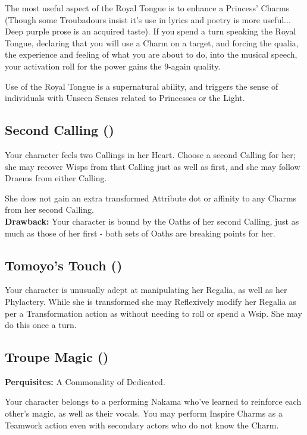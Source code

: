 The most useful aspect of the Royal Tongue is to enhance a Princess' Charms (Though some Troubadours insist it's use in lyrics and poetry is more useful... Deep purple prose is an acquired taste). If you spend a turn speaking the Royal Tongue, declaring that you will use a Charm on a target, and forcing the qualia, the experience and feeling of what you are about to do, into the musical speech, your activation roll for the power gains the 9-again quality. 

Use of the Royal Tongue is a supernatural ability, and triggers the sense of individuals with Unseen Senses related to Princesses or the Light.

\subsection*{Second Calling (\textbullet\textbullet)}
Your character feels two Callings in her Heart. Choose a second Calling for her; she may recover Wisps from that Calling just as well as first, and she may follow Draems from either Calling. 

She does not gain an extra transformed Attribute dot or affinity to any Charms from her second Calling.\\

\noindent \textbf{Drawback:} Your character is bound by the Oaths of her second Calling, just as much as those of her first - both sets of Oaths are breaking points for her.

\subsection*{Tomoyo's Touch (\textbullet)}

Your character is unusually adept at manipulating her Regalia, as well as her Phylactery. While she is transformed she may Reflexively modify her Regalia as per a Transformation action as without needing to roll or spend a Wsip. She may do this once a turn. 

\subsection*{Troupe Magic (\textbullet)}

\textbf{Perquisites:} A Commonality of Dedicated. 

Your character belongs to a performing Nakama who've learned to reinforce each other’s magic, as well as their vocals. You may perform Inspire Charms as a Teamwork action even with secondary actors who do not know the Charm. 

